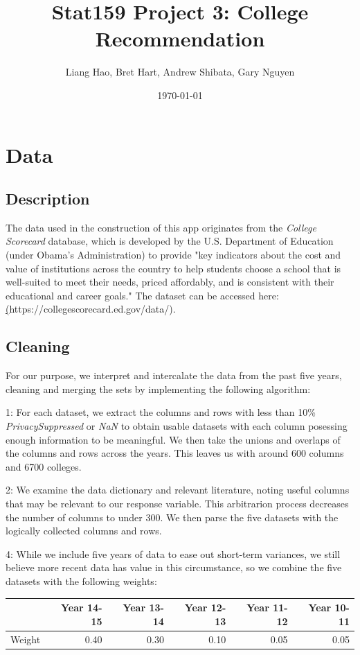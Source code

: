 \documentclass{article}\usepackage[]{graphicx}\usepackage[]{color}
\title{Stat159 Project 3: College Recommendation}
\author{Liang Hao, Bret Hart, Andrew Shibata, Gary Nguyen}
\date{\today}
\begin{document}
\maketitle
\section{Data}



\subsection{Description}

The data used in the construction of this app originates from the \emph{College Scorecard} database, which is developed by the U.S. Department of Education (under Obama's Administration) to provide "key indicators about the cost and value of institutions across the country to help students choose a school that is well-suited to meet their needs, priced affordably, and is consistent with their educational and career goals." The dataset can be accessed here: \href{website address}(https://collegescorecard.ed.gov/data/).

\subsection{Cleaning}
For our purpose, we interpret and intercalate the data from the past five years, cleaning and merging the sets by implementing the following algorithm:

1: For each dataset, we extract the columns and rows with less than 10\% \emph{PrivacySuppressed} or \emph{NaN} to obtain usable datasets with each column posessing enough information to be meaningful. We then take the unions and overlaps of the columns and rows across the years. This leaves us with around 600 columns and 6700 colleges.

2: We examine the data dictionary and relevant literature, noting useful columns that may be relevant to our response variable. This arbitrarion process decreases the number of columns to under 300. We then parse the five datasets with the logically collected columns and rows.

4: While we include five years of data to ease out short-term variances, we still believe more recent data has value in this circumstance, so we combine the five datasets with the following weights:

\begin{table}[ht]
\centering
\begin{tabular}{rrrrrr}
  \hline
 & Year 14-15 & Year 13-14 & Year 12-13 & Year 11-12 & Year 10-11 \\ 
  \hline
Weight & 0.40 & 0.30 & 0.10 & 0.05 & 0.05 \\ 
   \hline
\end{tabular}
\end{table}
\end{document}
